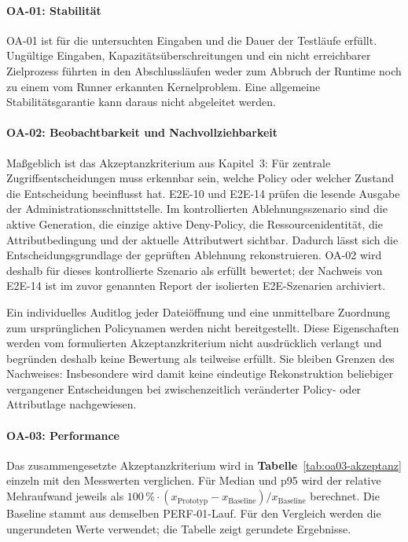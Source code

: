 \paragraph{OA-01: Stabilität}
OA-01 ist für die untersuchten Eingaben und die Dauer der Testläufe erfüllt. Ungültige Eingaben,
Kapazitätsüberschreitungen und ein nicht erreichbarer Zielprozess führten in den Abschlussläufen
weder zum Abbruch der Runtime noch zu einem vom Runner erkannten Kernelproblem. Eine allgemeine
Stabilitätsgarantie kann daraus nicht abgeleitet werden.

\paragraph{OA-02: Beobachtbarkeit und Nachvollziehbarkeit}
Maßgeblich ist das Akzeptanzkriterium aus Kapitel~3: Für zentrale Zugriffsentscheidungen muss
erkennbar sein, welche Policy oder welcher Zustand die Entscheidung beeinflusst hat.
E2E-10 und E2E-14 prüfen die lesende Ausgabe der Administrationsschnittstelle. Im kontrollierten
Ablehnungsszenario sind die aktive Generation, die einzige aktive Deny-Policy, die
Ressourcenidentität, die Attributbedingung und der aktuelle Attributwert sichtbar. Dadurch lässt
sich die Entscheidungsgrundlage der geprüften Ablehnung rekonstruieren. OA-02 wird deshalb
für dieses kontrollierte Szenario als erfüllt bewertet; der Nachweis von E2E-14 ist im zuvor
genannten Report der isolierten E2E-Szenarien archiviert.

Ein individuelles Auditlog jeder Dateiöffnung und eine unmittelbare Zuordnung zum ursprünglichen
Policynamen werden nicht bereitgestellt. Diese Eigenschaften werden vom formulierten
Akzeptanzkriterium nicht ausdrücklich verlangt und begründen deshalb keine Bewertung als
teilweise erfüllt. Sie bleiben Grenzen des Nachweises: Insbesondere wird damit keine eindeutige
Rekonstruktion beliebiger vergangener Entscheidungen bei zwischenzeitlich veränderter Policy-
oder Attributlage nachgewiesen.

\paragraph{OA-03: Performance}
Das zusammengesetzte Akzeptanzkriterium wird in \textbf{Tabelle}~\ref{tab:oa03-akzeptanz} einzeln mit den
Messwerten verglichen. Für Median und p95 wird der relative Mehraufwand jeweils als
\(100\,\% \cdot (x_{\mathrm{Prototyp}}-x_{\mathrm{Baseline}})/x_{\mathrm{Baseline}}\)
berechnet. Die Baseline stammt aus demselben PERF-01-Lauf. Für den Vergleich werden die
ungerundeten Werte verwendet; die Tabelle zeigt gerundete Ergebnisse.

